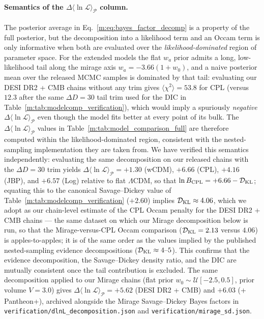 \documentclass[aps,prd,preprint,superscriptaddress,nofootinbib]{revtex4-2}
\begin{document}
\paragraph{Semantics of the $\Delta \langle \ln \mathcal{L} \rangle_{\mathcal{P}}$ column.} The posterior average in Eq.~\ref{m:eq:bayes_factor_decomp} is a property of the full posterior, but the decomposition into a likelihood term and an Occam term is only informative when both are evaluated over the \emph{likelihood-dominated} region of parameter space. For the extended models the flat $w_a$ prior admits a long, low-likelihood tail along the mirage axis $w_a = -3.66(1+w_0)$, and a naive posterior mean over the released MCMC samples is dominated by that tail: evaluating our DESI DR2 + CMB chains without any trim gives $\langle \chi^2 \rangle = 53.8$ for CPL (versus $12.3$ after the same $\Delta D = 30$ tail trim used for the DIC in Table~\ref{m:tab:modelcomp_verification}), which would imply a spuriously \emph{negative} $\Delta \langle \ln \mathcal{L} \rangle_{\mathcal{P}}$ even though the model fits better at every point of its bulk. The $\Delta \langle \ln \mathcal{L} \rangle_{\mathcal{P}}$ values in Table~\ref{m:tab:model_comparison_full} are therefore computed within the likelihood-dominated region, consistent with the nested-sampling implementation they are taken from. We have verified this semantics independently: evaluating the same decomposition on our released chains with the $\Delta D = 30$ trim yields $\Delta \langle \ln \mathcal{L} \rangle_{\mathcal{P}} = +1.30$ (wCDM), $+6.66$ (CPL), $+4.16$ (JBP), and $+6.57$ (Log) relative to flat $\Lambda$CDM, so that $\ln B_{\rm CPL} = +6.66 - \mathcal{D}_{\rm KL}$; equating this to the canonical Savage--Dickey value of Table~\ref{m:tab:modelcomp_verification} ($+2.60$) implies $\mathcal{D}_{\rm KL} \approx 4.06$, which we adopt as our chain-level estimate of the CPL Occam penalty for the DESI DR2 + CMB chains --- the same dataset on which our Mirage decomposition below is run, so that the Mirage-versus-CPL Occam comparison ($\mathcal{D}_{\rm KL} = 2.13$ versus $4.06$) is apples-to-apples; it is of the same order as the values implied by the published nested-sampling evidence decompositions ($\mathcal{D}_{\rm KL} \approx 4\text{--}5$). This confirms that the evidence decomposition, the Savage--Dickey density ratio, and the DIC are mutually consistent once the tail contribution is excluded. The same decomposition applied to our Mirage chains (flat prior $w_0 \sim \mathcal{U}[-2.5, 0.5]$, prior volume $V = 3.0$) gives $\Delta\langle\ln\mathcal{L}\rangle_{\mathcal{P}} = +5.62$ (DESI DR2 + CMB) and $+6.03$ (+ Pantheon+), archived alongside the Mirage Savage--Dickey Bayes factors in \texttt{verification/dlnL\_decomposition.json} and \texttt{verification/mirage\_sd.json}.
\end{document}
